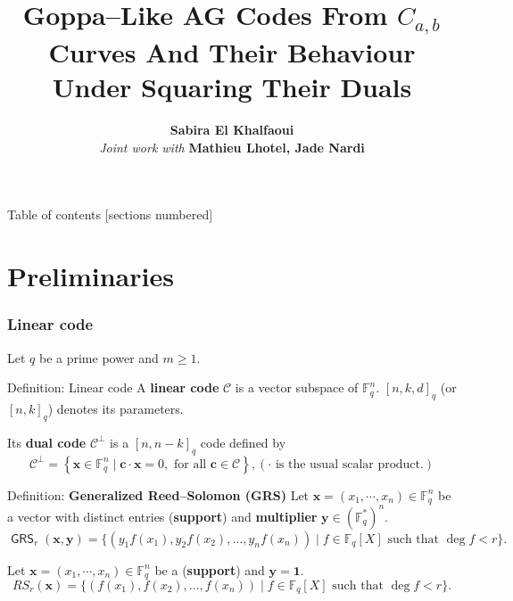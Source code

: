 \documentclass[
10pt, %
%
aspectratio=169, %
]{beamer}
\title[Goppa-Like AG codes Distinguisher]{Goppa–Like AG Codes From $C_{a,b}$ Curves And Their Behaviour Under Squaring Their Duals}
\author[SEK]{\textbf{Sabira El Khalfaoui} \vspace{0.3cm}\\\vspace{1cm} \textit{\textcolor{ballblue}{Joint work with}} \textbf{Mathieu Lhotel, Jade Nardi}}
\institute[]{\large{\textbf{IRMAR} \\ \smallskip \textit{\textcolor{ballblue}{GAE seminar}}}}
\date[Mai 2023]
\theoremstyle{plain}%
\theoremstyle{definition}
\theoremstyle{remark}
\newcommand{\calC}{\mathcal{C}}
\newcommand{\fq}{\mathbb{F}_{q}}
\newcommand{\GRS}{\operatorname{\mathsf{GRS}}}
\begin{document}
	
	\maketitle
	
	\begin{frame}{Table of contents}
		[sections numbered]
		\tableofcontents%
	\end{frame}
	
	\section{Preliminaries}
	
	\begin{frame}
		\frametitle{Linear code}
		Let $q$ be a prime power and $m \geq 1$. 
		\begin{block}{Definition: Linear code}
			A \textbf{linear code} $\calC$ is a vector subspace of $\fq^n$. $[n,k,d]_{q}$ (or $[n,k]_{q}$) denotes its parameters.
		\end{block}

	 Its \textbf{dual code} $\calC^{\perp}$ is a $[n,n-k]_{q}$ code defined by 
	\[\calC^{\perp}=\left\lbrace \mathbf{x} \in \fq^n \mid \mathbf{c} \cdot \mathbf{x}=0, \text{ for all } \mathbf{c} \in \calC \right\rbrace, (\text{$\cdot$ is the usual scalar product.})\]  
	
		\begin{block}{Definition: \textbf{Generalized Reed--Solomon (GRS)}}
			Let $\mathbf{x}=(x_1,\cdots,x_n) \in \fq^n$ be a vector with distinct entries (\textbf{support}) and \textbf{multiplier} $\mathbf{y} \in (\fq^*)^n$.
			\vspace{-0.7em}
			\[\GRS_r(\mathbf{x},\mathbf{y})=\{(y_1f(x_1),y_2f(x_2),\dots,y_nf(x_n)) \mid f \in \fq[X] \text{ such that } \deg f < r \}.\]
		\end{block}
	\begin{tcolorbox}[colback=aliceblue]
		Let $\mathbf{x}=(x_1,\cdots,x_n) \in \fq^n$ be a (\textbf{support}) and $\mathbf{y} = \mathbf{1}$.
		\vspace{-0.7em}
		\[RS_r(\mathbf{x})=\{(f(x_1),f(x_2),\dots,f(x_n)) \mid f \in \fq[X] \text{ such that } \deg f < r \}.\]
	\end{tcolorbox}
	\end{frame}
\end{document}
